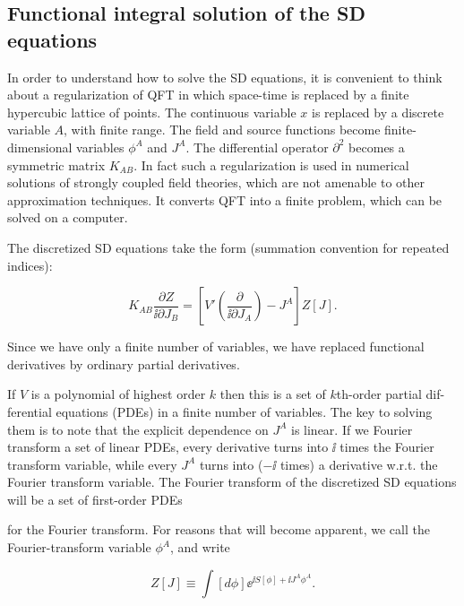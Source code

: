 \subsection{Functional integral solution of the SD equations}

In order to understand how to solve the SD equations, it is convenient to think about a
regularization of QFT in which space-time is replaced by a finite hypercubic lattice of
points. The continuous variable $x$ is replaced by a discrete variable $A$, with finite range.
The field and source functions become finite-dimensional variables $\phi^A$ and $J^A$. The
differential operator $\partial^2$ becomes a symmetric matrix $K_{AB}$. In fact such a
regularization is used in numerical solutions of strongly coupled field theories, which are not
amenable to other approximation techniques. It converts QFT into a finite problem, which
can be solved on a computer.

The discretized SD equations take the form (summation convention for repeated
indices):

\begin{equation}
 K_{AB}\frac{\partial Z}{\ii\partial J_B}
 =\left[V'\left(\frac{\partial}{\ii\partial J_A}\right)-J^A\right]Z[J].
\label{eq:3.10}
\end{equation}

Since we have only a finite number of variables, we have replaced functional derivatives
by ordinary partial derivatives.

If $V$ is a polynomial of highest order $k$ then this is a set of $k$th-order partial dif-
ferential equations (PDEs) in a finite number of variables. The key to solving them is
to note that the explicit dependence on $J^A$ is linear. If we Fourier transform a set of
linear PDEs, every derivative turns into $\ii$ times the Fourier transform variable, while
every $J^A$ turns into ($-\ii$ times) a derivative w.r.t. the Fourier transform variable. The
Fourier transform of the discretized SD equations will be a set of first-order PDEs

for the Fourier transform. For reasons that will become apparent, we call the
Fourier-transform variable $\phi^A$, and write

\begin{equation}
Z[J]\equiv\int[d\phi]\ee^{\ii S[\phi]+\ii J^A\phi^A}.
\label{eq:3.11}
\end{equation}


